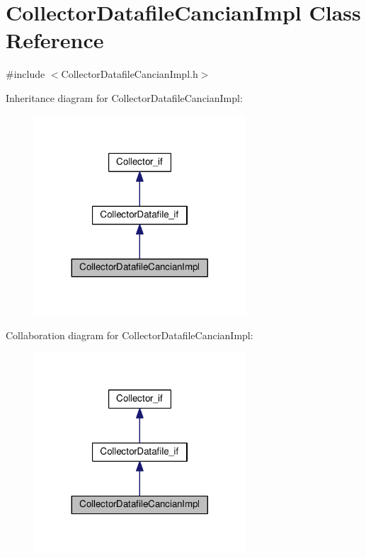 \hypertarget{class_collector_datafile_cancian_impl}{\section{Collector\-Datafile\-Cancian\-Impl Class Reference}
\label{class_collector_datafile_cancian_impl}
}


{\ttfamily \#include $<$Collector\-Datafile\-Cancian\-Impl.\-h$>$}



Inheritance diagram for Collector\-Datafile\-Cancian\-Impl\-:\nopagebreak
\begin{figure}[H]
\begin{center}
\leavevmode
\includegraphics[width=224pt]{class_collector_datafile_cancian_impl__inherit__graph}
\end{center}
\end{figure}


Collaboration diagram for Collector\-Datafile\-Cancian\-Impl\-:\nopagebreak
\begin{figure}[H]
\begin{center}
\leavevmode
\includegraphics[width=224pt]{class_collector_datafile_cancian_impl__coll__graph}
\end{center}
\end{figure}
